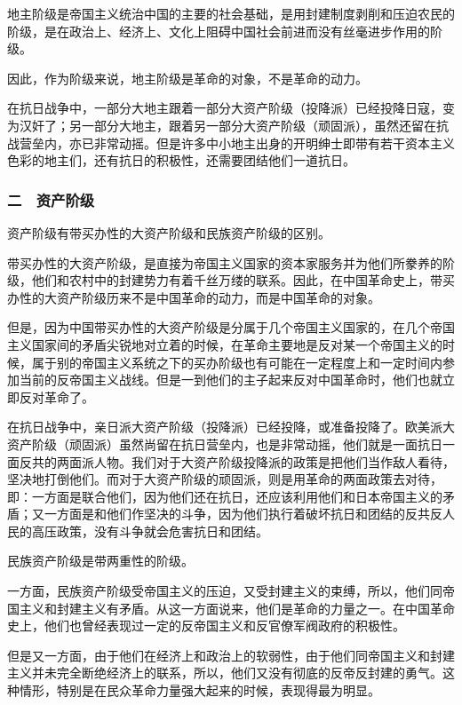地主阶级是帝国主义统治中国的主要的社会基础，是用封建制度剥削和压迫农民的阶级，是在政治上、经济上、文化上阻碍中国社会前进而没有丝毫进步作用的阶级。

因此，作为阶级来说，地主阶级是革命的对象，不是革命的动力。

在抗日战争中，一部分大地主跟着一部分大资产阶级（投降派）已经投降日寇，变为汉奸了；另一部分大地主，跟着另一部分大资产阶级（顽固派），虽然还留在抗战营垒内，亦已非常动摇。但是许多中小地主出身的开明绅士即带有若干资本主义色彩的地主们，还有抗日的积极性，还需要团结他们一道抗日。

\subsubsection{二　资产阶级}

资产阶级有带买办性的大资产阶级和民族资产阶级的区别。

带买办性的大资产阶级，是直接为帝国主义国家的资本家服务并为他们所豢养的阶级，他们和农村中的封建势力有着千丝万缕的联系。因此，在中国革命史上，带买办性的大资产阶级历来不是中国革命的动力，而是中国革命的对象。

但是，因为中国带买办性的大资产阶级是分属于几个帝国主义国家的，在几个帝国主义国家间的矛盾尖锐地对立着的时候，在革命主要地是反对某一个帝国主义的时候，属于别的帝国主义系统之下的买办阶级也有可能在一定程度上和一定时间内参加当前的反帝国主义战线。但是一到他们的主子起来反对中国革命时，他们也就立即反对革命了。

在抗日战争中，亲日派大资产阶级（投降派）已经投降，或准备投降了。欧美派大资产阶级（顽固派）虽然尚留在抗日营垒内，也是非常动摇，他们就是一面抗日一面反共的两面派人物。我们对于大资产阶级投降派的政策是把他们当作敌人看待，坚决地打倒他们。而对于大资产阶级的顽固派，则是用革命的两面政策去对待，即：一方面是联合他们，因为他们还在抗日，还应该利用他们和日本帝国主义的矛盾；又一方面是和他们作坚决的斗争，因为他们执行着破坏抗日和团结的反共反人民的高压政策，没有斗争就会危害抗日和团结。

民族资产阶级是带两重性的阶级。

一方面，民族资产阶级受帝国主义的压迫，又受封建主义的束缚，所以，他们同帝国主义和封建主义有矛盾。从这一方面说来，他们是革命的力量之一。在中国革命史上，他们也曾经表现过一定的反帝国主义和反官僚军阀政府的积极性。

但是又一方面，由于他们在经济上和政治上的软弱性，由于他们同帝国主义和封建主义并未完全断绝经济上的联系，所以，他们又没有彻底的反帝反封建的勇气。这种情形，特别是在民众革命力量强大起来的时候，表现得最为明显。

